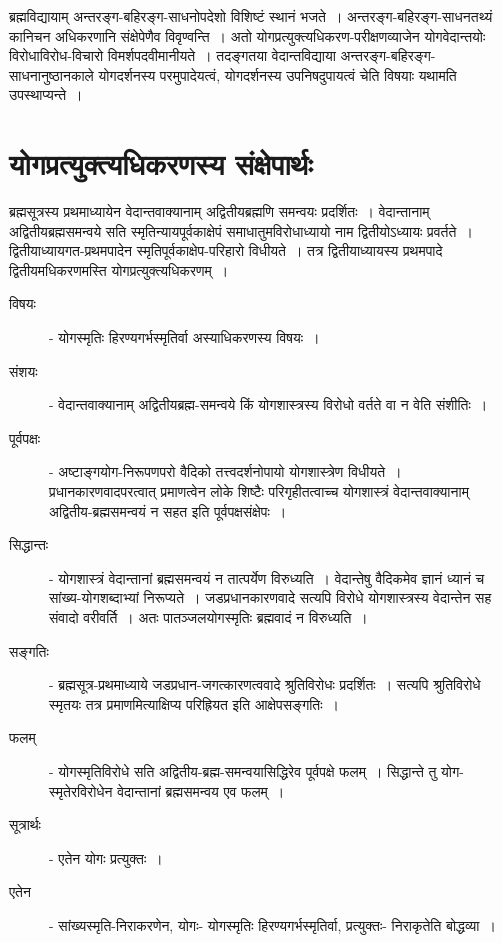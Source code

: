 {ब्रह्मविद्यायाम् अन्तरङ्ग-बहिरङ्ग-साधनोपदेशो विशिष्टं स्थानं भजते~। अन्तरङ्ग-बहिरङ्ग-साधनतथ्यं कानिचन अधिकरणानि संक्षेपेणैव विवृण्वन्ति~। अतो योगप्रत्युक्त्यधिकरण-परीक्षणव्याजेन योगवेदान्तयोः विरोधाविरोध-विचारो विमर्शपदवीमानीयते~। तदङ्गतया वेदान्तविद्याया अन्तरङ्ग-बहिरङ्ग-साधनानुष्ठानकाले योगदर्शनस्य परमुपादेयत्वं, योगदर्शनस्य उपनिषदुपायत्वं चेति विषयाः यथामति उपस्थाप्यन्ते~। 

\section*{योगप्रत्युक्त्यधिकरणस्य संक्षेपार्थः}

ब्रह्मसूत्रस्य प्रथमाध्यायेन वेदान्तवाक्यानाम् अद्वितीयब्रह्मणि समन्वयः प्रदर्शितः~। वेदान्तानाम् अद्वितीयब्रह्मसमन्वये सति स्मृतिन्यायपूर्वकाक्षेपं समाधातुमविरोधाध्यायो नाम द्वितीयोऽध्यायः प्रवर्तते~। द्वितीयाध्यायगत-प्रथमपादेन स्मृतिपूर्वकाक्षेप-परिहारो विधीयते~। तत्र द्वितीयाध्यायस्य प्रथमपादे द्वितीयमधिकरणमस्ति योगप्रत्युक्त्यधिकरणम्~। 

\begin{description}
\item[विषयः] - योगस्मृतिः हिरण्यगर्भस्मृतिर्वा अस्याधिकरणस्य विषयः~। 
\item[संशयः] - वेदान्तवाक्यानाम् अद्वितीयब्रह्म-समन्वये किं योगशास्त्रस्य विरोधो वर्तते वा न वेति संशीतिः~। 
\item[पूर्वपक्षः] - अष्टाङ्गयोग-निरूपणपरो वैदिको तत्त्वदर्शनोपायो योगशास्त्रेण विधीयते~। प्रधानकारणवादपरत्वात् प्रमाणत्वेन लोके शिष्टैः परिगृहीतत्वाच्च योगशास्त्रं वेदान्तवाक्यानाम् अद्वितीय-ब्रह्मसमन्वयं न सहत इति पूर्वपक्षसंक्षेपः~। 
\item[सिद्धान्तः] - योगशास्त्रं वेदान्तानां ब्रह्मसमन्वयं न तात्पर्येण विरुध्यति~। वेदान्तेषु वैदिकमेव ज्ञानं ध्यानं च सांख्य-योगशब्दाभ्यां निरूप्यते~। जडप्रधानकारणवादे सत्यपि विरोधे योगशास्त्रस्य वेदान्तेन सह संवादो वरीवर्ति~। अतः पातञ्जलयोगस्मृतिः ब्रह्मवादं न विरुध्यति~। 
\item[सङ्गतिः] - ब्रह्मसूत्र-प्रथमाध्याये जडप्रधान-जगत्कारणत्ववादे श्रुतिविरोधः प्रदर्शितः~। सत्यपि श्रुतिविरोधे स्मृतयः तत्र प्रमाणमित्याक्षिप्य परिह्रियत इति आक्षेपसङ्गतिः~। 
\item[फलम्] - योगस्मृतिविरोधे सति अद्वितीय-ब्रह्म-समन्वयासिद्धिरेव पूर्वपक्षे फलम्~। सिद्धान्ते तु योग-स्मृतेरविरोधेन वेदान्तानां ब्रह्मसमन्वय एव फलम्~। 
\item[सूत्रार्थः] - एतेन योगः प्रत्युक्तः~। 
\item[एतेन] - सांख्यस्मृति-निराकरणेन, योगः- योगस्मृतिः हिरण्यगर्भस्मृतिर्वा, प्रत्युक्तः- निराकृतेति बोद्धव्या~। 
\end{description}

}
